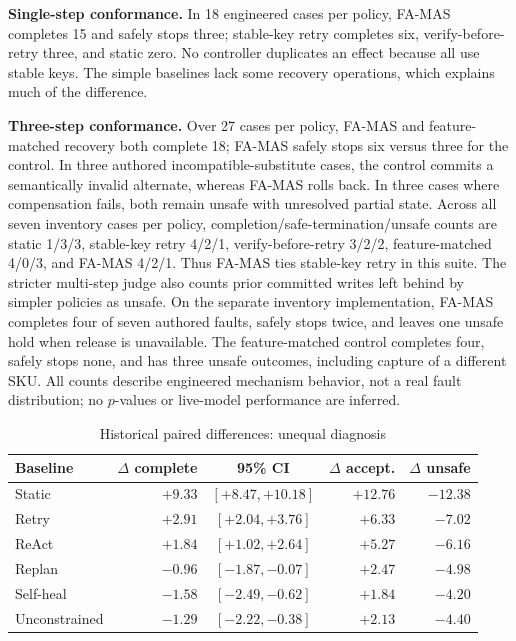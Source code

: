 \documentclass[10pt,journal,compsoc]{IEEEtran}
\newcommand{\famas}{FA-MAS}
\begin{document}
\textbf{Single-step conformance.} In 18 engineered cases per policy, \famas{} completes 15 and safely stops three; stable-key retry completes six, verify-before-retry three, and static zero. No controller duplicates an effect because all use stable keys. The simple baselines lack some recovery operations, which explains much of the difference.

\textbf{Three-step conformance.} Over 27 cases per policy, \famas{} and feature-matched recovery both complete 18; \famas{} safely stops six versus three for the control. In three authored incompatible-substitute cases, the control commits a semantically invalid alternate, whereas \famas{} rolls back. In three cases where compensation fails, both remain unsafe with unresolved partial state. Across all seven inventory cases per policy, completion/safe-termination/unsafe counts are static 1/3/3, stable-key retry 4/2/1, verify-before-retry 3/2/2, feature-matched 4/0/3, and FA-MAS 4/2/1. Thus FA-MAS ties stable-key retry in this suite. The stricter multi-step judge also counts prior committed writes left behind by simpler policies as unsafe. On the separate inventory implementation, \famas{} completes four of seven authored faults, safely stops twice, and leaves one unsafe hold when release is unavailable. The feature-matched control completes four, safely stops none, and has three unsafe outcomes, including capture of a different SKU. All counts describe engineered mechanism behavior, not a real fault distribution; no $p$-values or live-model performance are inferred.

\begin{table}[!t]
\centering
\caption{Historical paired differences: unequal diagnosis}\label{tab:paired}
\footnotesize
\setlength{\tabcolsep}{4pt}
\begin{tabular}{@{}lrcrr@{}}
\toprule
Baseline & $\Delta$ complete & 95\% CI & $\Delta$ accept. & $\Delta$ unsafe\\
\midrule
Static & $+9.33$ & $[+8.47, +10.18]$ & $+12.76$ & $-12.38$\\
Retry & $+2.91$ & $[+2.04, +3.76]$ & $+6.33$ & $-7.02$\\
ReAct & $+1.84$ & $[+1.02, +2.64]$ & $+5.27$ & $-6.16$\\
Replan & $-0.96$ & $[-1.87, -0.07]$ & $+2.47$ & $-4.98$\\
Self-heal & $-1.58$ & $[-2.49, -0.62]$ & $+1.84$ & $-4.20$\\
Unconstrained & $-1.29$ & $[-2.22, -0.38]$ & $+2.13$ & $-4.40$\\
\bottomrule
\end{tabular}
\end{table}
\end{document}
